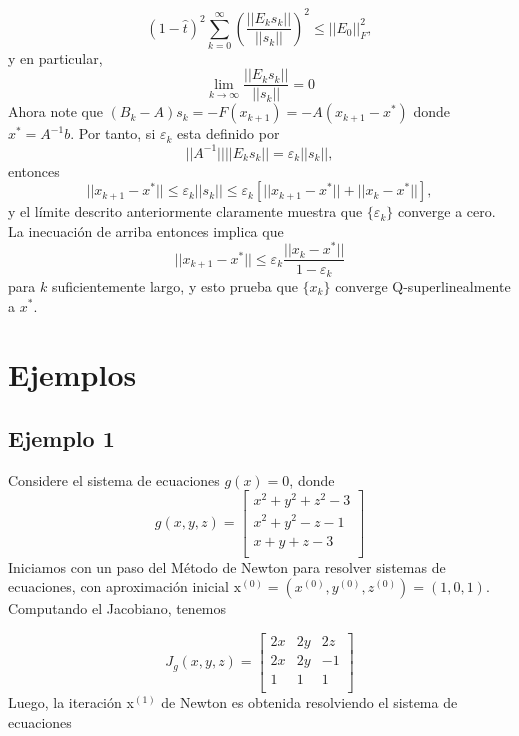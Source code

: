 \documentclass[12pt]{article}
\begin{document}
\begin{equation*}
    (1 - \hat{t})^2 \sum_{k=0}^\infty \left( \frac{||E_k s_k||}{||s_k||} \right)^2 \leq ||E_0||_F^2,
\end{equation*}
y en particular,
\begin{equation*}
    \lim_{k \to \infty} \frac{||E_k s_k||}{||s_k||} = 0
\end{equation*}
Ahora note que $(B_k - A) s_k = - F(x_{k+1}) = -A (x_{k+1} - x^*)$ donde $x^* = A^{-1} b$.
Por tanto, si $\varepsilon_k$ esta definido por
\begin{equation*}
    ||A^{-1}||||E_k s_k|| = \varepsilon_k ||s_k||,
\end{equation*}
entonces
\begin{equation*}
    ||x_{k+1} - x^*|| \leq \varepsilon_k ||s_k|| \leq \varepsilon_k [||x_{k+1} - x^*|| + ||x_k - x^*||],
\end{equation*}
y el límite descrito anteriormente claramente muestra que $\{ \varepsilon_k\}$ converge a cero. La inecuación de arriba entonces implica que
\begin{equation*}
    ||x_{k+1} - x^*|| \leq \varepsilon_k \frac{||x_k - x^*||}{1 - \varepsilon_k}
\end{equation*}
para $k$ suficientemente largo, y esto prueba que $\{ x_k \}$ converge Q-superlinealmente a $x^*$.

\section{Ejemplos}

\subsection{Ejemplo 1}
Considere el sistema de ecuaciones $g(x) = 0$, donde
\begin{equation*}
    g(x, y, z) = 
    \begin{bmatrix}
        x^2 + y^2 + z^2 - 3 \\
        x^2 + y^2 - z - 1 \\
        x + y + z - 3 \\
    \end{bmatrix}
\end{equation*}
Iniciamos con un paso del Método de Newton para resolver sistemas de ecuaciones, con aproximación inicial $\text{x}^{(0)} = (x^{(0)}, y^{(0)}, z^{(0)}) = (1, 0, 1)$. Computando el Jacobiano, tenemos

\begin{equation*}
    J_g(x, y, z) = 
    \begin{bmatrix}
        2x & 2y & 2z \\
        2x & 2y & -1 \\
        1 & 1 & 1 \\
    \end{bmatrix}
\end{equation*}
Luego, la iteración x$^{(1)}$ de Newton es obtenida resolviendo el sistema de ecuaciones
\end{document}
